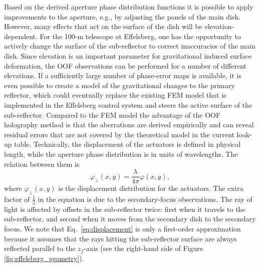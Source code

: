 \documentclass[
    ]
    {aa}
\newenvironment{NOTE}[1][\unskip]{%
\par
\medskip
\noindent
\color{red}\bfseries{NOTE #1:}
\noindent}
{}
\begin{document}
    Based on the derived aperture phase distribution functions it is possible to apply improvements to the aperture, e.g., by adjusting the panels of the main dish. However, many effects that act on the surface of the dish will be elevation-dependent. For the 100-m telescope at Effelsberg, one has the opportunity to actively change the surface of the sub-reflector to correct inaccuracies of the main dish. Since elevation is an important parameter for gravitational induced surface deformation, the OOF observations can be performed for a number of different elevations. If a sufficiently large number of phase-error maps is available, it is even possible to create a model of the gravitational changes to the primary reflector, which could eventually replace the existing FEM model that is implemented in the Effelsberg control system and steers the active surface of the sub-reflector. 
    Compared to the FEM model the advantage of the OOF holography method is that the aberrations are derived empirically and can reveal residual errors that are not covered by the theoretical model in the current look-up table. Technically, the displacement of the actuators is defined in physical length, while the aperture phase distribution is in units of wavelengths. The relation between them is
    \begin{equation}
        \varphi_\bot(x, y) = \frac{\lambda}{4\pi} \varphi(x, y),
        \label{eq:displacement}
    \end{equation}
    where $\varphi_\bot(x, y)$ is the displacement distribution for the actuators. The extra factor of $\frac{1}{2}$ in the equation is due to the secondary-focus observations. The ray of light is affected by offsets in the sub-reflector twice: first when it travels to the sub-reflector, and second when it moves from the secondary dish to the secondary focus. We note that Eq.~\eqref{eq:displacement} is only a first-order approximation because it assumes that the rays hitting the sub-reflector surface are always reflected parallel to the $z_f$-axis (see the right-hand side of Figure \ref{fig:effelsberg_geometry}).

\end{document}
